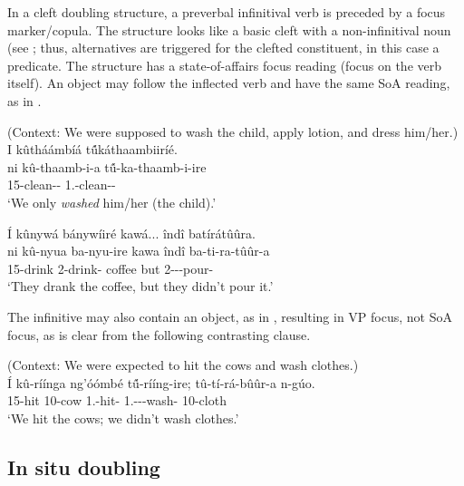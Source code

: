 \documentclass[output=paper]{langscibook}
\begin{document}
In a cleft doubling structure, a preverbal infinitival verb is preceded by a focus marker/copula. The structure looks like a basic cleft with a non-infinitival noun (see ; thus, alternatives are triggered for the clefted constituent, in this case a predicate. The structure has a state-of-affairs focus reading (focus on the verb itself). An object may follow the inflected verb and have the same SoA reading, as in .\largerpage[-1]\pagebreak

\ea
(Context: We were supposed to wash the child, apply lotion, and dress him/her.)\\
I  kûtháámbíá  t\'{û}káthaambiiríé.\\
\gll
{ni  kû-thaamb-i-a  t\'{û}-ka-thaamb-i-ire}\\
\FOC{} 15-clean-\IC{}-\FV{} 1\PL.\OM{}-clean-\IC{}-\PFV{}\\
\glt
‘We only \textit{washed} him/her (the child).’

\z
\ea
\label{bkm:Ref115797598}
Í kûnywá bánywíiré kawá... \/{î}ndî batírátûûra.\\
\gll
ni kû-nyua  ba-nyu-ire  kawa  îndî  ba-ti-ra-tûûr-a\\
\FOC{} 15-drink   2\SM{}-drink-\PFV{} coffee  but 2\SM-\NEG-\YPST{}-pour-\FV{}\\
\glt
‘They drank the coffee, but they didn't pour it.’

\z
The infinitive may also contain an object, as in , resulting in VP focus, not SoA focus, as is clear from the following contrasting clause. 

\ea
\label{bkm:Ref115797559}
(Context: We were expected to hit the cows and wash clothes.)\\
\gll
{Í  kû-ríínga  ng’óómbé  t\'{û}-rííng-ire;  tû-tí-rá-bûûr-a  n-gúo.}\\
\FOC{} 15-hit  10-cow 1\PL.\SM{}-hit-\PFV{} 1\PL.\SM-\NEG-\YPST{}-wash-\FV{} 10-cloth\\
\glt
‘We hit the cows; we didn’t wash clothes.’

\z



\subsection{In situ doubling}
\end{document}
